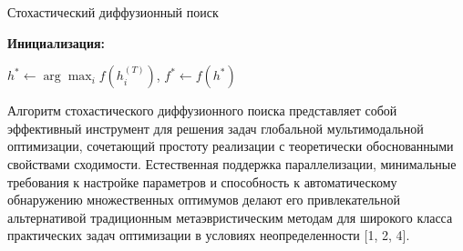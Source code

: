 \documentclass{article}
\newcommand{\1}{\mathds{1}}
\begin{document}
\begin{algorithm}[H]
\caption{Стохастический диффузионный поиск}

\textbf{Инициализация:} 


$h^* \gets \arg\max_{i} f(h_i^{(T)})$, $f^* \gets f(h^*)$\;

\end{algorithm}

Алгоритм стохастического диффузионного поиска представляет собой эффективный инструмент для решения задач глобальной мультимодальной оптимизации, сочетающий простоту реализации с теоретически обоснованными свойствами сходимости. Естественная поддержка параллелизации, минимальные требования к настройке параметров и способность к автоматическому обнаружению множественных оптимумов делают его привлекательной альтернативой традиционным метаэвристическим методам для широкого класса практических задач оптимизации в условиях неопределенности [1, 2, 4].
\end{document}
